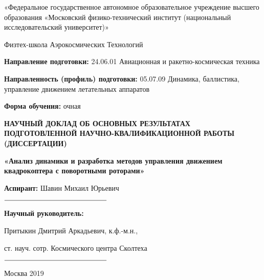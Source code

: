 \thispagestyle{empty}
\begin{center} 
«Федеральное государственное автономное образовательное учреждение высшего образования «Московский физико-технический институт (национальный исследовательский университет)»
\end{center}
\begin{center} 
Физтех-школа Аэрокосмических Технологий
\end{center}

{
   	\vskip 5mm
}

\begin{flushleft}
\textbf{Направление подготовки:} 24.06.01 Авиационная и ракетно-космическая техника

\textbf{Направленность (профиль) подготовки:} 05.07.09 Динамика, баллистика, управление движением летательных аппаратов

\textbf{Форма обучения:} очная
\end{flushleft}

{
	\vskip 1cm
}

\begin{center} 
\textbf{НАУЧНЫЙ ДОКЛАД ОБ ОСНОВНЫХ РЕЗУЛЬТАТАХ ПОДГОТОВЛЕННОЙ НАУЧНО-КВАЛИФИКАЦИОННОЙ РАБОТЫ (ДИССЕРТАЦИИ)}
\end{center}

\begin{center} 
\textbf{«Анализ динамики и разработка методов управления движением квадрокоптера с поворотными роторами»}
\end{center}

{
	\vskip 1cm
}


\begin{flushright}
\textbf{Аспирант:} Шавин Михаил Юрьевич \hspace{16mm} \vspace{5mm}

$\rule{5cm}{0.15mm}$

\textbf{Научный руководитель:}  \hspace{41mm}

Притыкин Дмитрий Аркадьевич, к.ф.-м.н., \hspace{6mm} 

ст. науч. сотр. Космического центра Сколтеха \vspace{5mm}

$\rule{5cm}{0.15mm}$

\end{flushright}

{
	\vskip 5mm
}

\begin{center} 
Москва 2019
\end{center}
